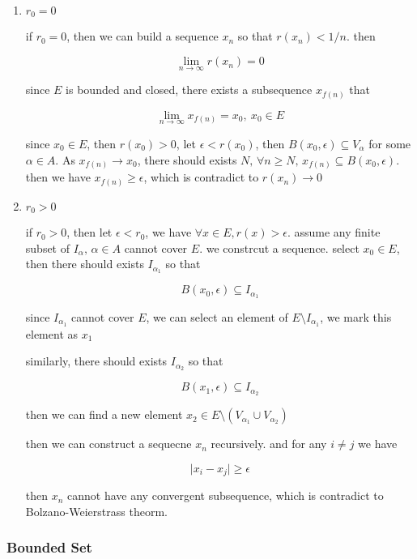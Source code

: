 \documentclass[11pt,a4paper]{article}
\begin{document}
\begin{enumerate}
    \item $r_0 = 0$

    if $r_0 = 0$, then we can build a sequence $x_n$ so that $r(x_n) < 1/n$. then

    \[
        \lim_{n \to \infty}r(x_n) = 0
    \]

    since $E$ is bounded and closed, there exists a subsequence $x_{f(n)}$ that

    \[
        \lim_{n \to \infty}x_{f(n)} = x_0,\: x_0 \in E
    \]

    since $x_0 \in E$, then $r(x_0) > 0$, let $\epsilon < r(x_0)$, then 
    $B(x_0, \epsilon) \subseteq V_{\alpha}$ for some $\alpha \in A$. As $x_{f(n)} \to x_0$,
    there should exists $N,\, \forall n \ge N,\, x_{f(n)} \subseteq B(x_0, \epsilon)$. then we have 
    $x_{f(n)} \ge \epsilon$, which is contradict to $r(x_n) \to 0$


    \item $r_0 > 0$

    if $r_0 > 0$, then let $\epsilon < r_0$, we have $\forall x \in E, r(x) > \epsilon$. assume any finite subset of $I_{\alpha},\, \alpha \in A$ cannot cover $E$.
    we constrcut a sequence. select $x_0 \in E$, then there should exists $I_{\alpha_1}$ so that

    \[
        B(x_0, \epsilon) \subseteq I_{\alpha_1}
    \]

    since $I_{\alpha_1}$ cannot cover $E$, we can select an element of $E \setminus I_{\alpha_1}$, we mark this element as $x_1$

    similarly, there should exists $I_{\alpha_2}$ so that

    \[
        B(x_1, \epsilon) \subseteq I_{\alpha_2}
    \]

    then we can find a new element $x_2 \in E \setminus (V_{\alpha_1} \cup V_{\alpha_2})$

    then we can construct a sequecne $x_n$ recursively. and for any $i \ne j$ we have

    \[
        \lvert x_i - x_j \rvert \ge \epsilon
    \]

    then $x_n$ cannot have any convergent subsequence, which is contradict to Bolzano-Weierstrass theorm.

\end{enumerate}

\subsubsection{Bounded Set}
\end{document}
